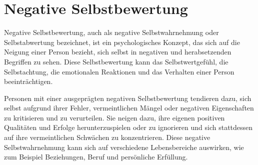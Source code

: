\section{Negative Selbstbewertung}

Negative Selbstbewertung, auch als negative Selbstwahrnehmung oder Selbstabwertung bezeichnet, ist ein psychologisches Konzept, das sich auf die Neigung einer Person bezieht, sich selbst in negativen und herabsetzenden Begriffen zu sehen. Diese Selbstbewertung kann das Selbstwertgefühl, die Selbstachtung, die emotionalen Reaktionen und das Verhalten einer Person beeinträchtigen.

Personen mit einer ausgeprägten negativen Selbstbewertung tendieren dazu, sich selbst aufgrund ihrer Fehler, vermeintlichen Mängel oder negativen Eigenschaften zu kritisieren und zu verurteilen. Sie neigen dazu, ihre eigenen positiven Qualitäten und Erfolge herunterzuspielen oder zu ignorieren und sich stattdessen auf ihre vermeintlichen Schwächen zu konzentrieren. Diese negative Selbstwahrnehmung kann sich auf verschiedene Lebensbereiche auswirken, wie zum Beispiel Beziehungen, Beruf und persönliche Erfüllung.

